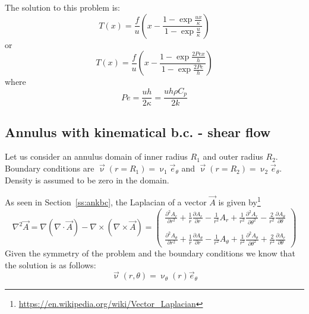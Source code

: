 The solution to this problem is:
\[
T(x) = \frac{f}{u}\left( x - \frac{1-\exp \frac{ux}{\kappa}}{1-\exp \frac{u}{\kappa} } \right)
\]
or 
\[
T(x) = \frac{f}{u}\left( x - \frac{1-\exp \frac{2 Pe x}{h}}{1-\exp \frac{2 Pe}{h} } \right)
\]
where
\[
Pe = \frac{uh}{2 \kappa} = \frac{u h \rho C_p}{2 k}
\]


\subsection{Annulus with kinematical b.c. - shear flow}\label{ss:sfan}

Let us consider an annulus domain of inner radius $R_1$ and outer radius $R_2$.
Boundary conditions are $\vec\upnu(r=R_1)=\upnu_1 \vec{e}_\theta$ and 
$\vec\upnu(r=R_2)=\upnu_2 \vec{e}_\theta$. Density is assumed to be zero in the domain. 

As seen in Section~\ref{ss:ankbc}, the Laplacian of a vector $\vec{A}$ is given 
by\footnote{\url{https://en.wikipedia.org/wiki/Vector\_Laplacian}} 
\[
\nabla^2 \vec{A} = \nabla(\nabla\cdot\vec{A}) - \nabla\times(\nabla \times\vec{A})
=
\left(
\begin{array}{l}
\frac{\partial^2 A_r}{\partial r^2} + \frac{1}{r} \frac{\partial A_r}{\partial r} - \frac{1}{r^2} A_r  + \frac{1}{r^2} \frac{\partial^2 A_r}{\partial \theta^2}  - \frac{2}{r^2} \frac{\partial A_\theta}{\partial \theta} \\ \\
\frac{\partial^2 A_\theta}{\partial r^2} + \frac{1}{r} \frac{\partial A_\theta}{\partial r} - \frac{1}{r^2} A_\theta  + \frac{1}{r^2} \frac{\partial^2 A_\theta}{\partial \theta^2}  + \frac{2}{r^2} \frac{\partial A_r}{\partial \theta} 
\end{array}
\right)
\]
Given the symmetry of the problem and the boundary conditions we know that the 
solution is as follows: 
\[
{\vec \upnu}(r,\theta) = \upnu_\theta(r) {\vec e}_\theta
\]

